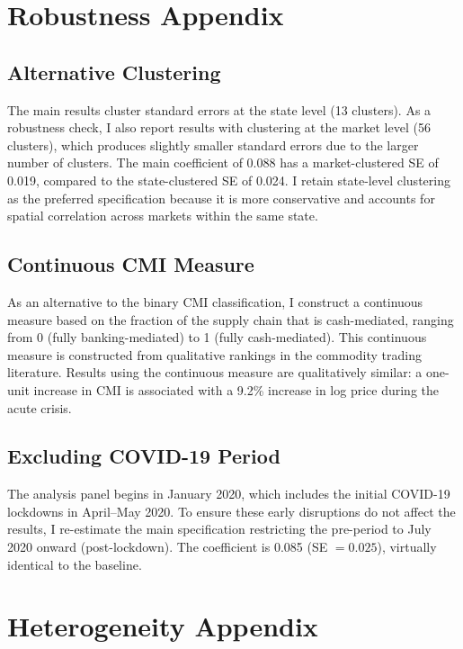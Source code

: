 \documentclass[12pt]{article}
\begin{document}
\section{Robustness Appendix}
\label{app:robustness}

\subsection{Alternative Clustering}

The main results cluster standard errors at the state level (13 clusters). As a robustness check, I also report results with clustering at the market level (56 clusters), which produces slightly smaller standard errors due to the larger number of clusters. The main coefficient of 0.088 has a market-clustered SE of 0.019, compared to the state-clustered SE of 0.024. I retain state-level clustering as the preferred specification because it is more conservative and accounts for spatial correlation across markets within the same state.

\subsection{Continuous CMI Measure}

As an alternative to the binary CMI classification, I construct a continuous measure based on the fraction of the supply chain that is cash-mediated, ranging from 0 (fully banking-mediated) to 1 (fully cash-mediated). This continuous measure is constructed from qualitative rankings in the commodity trading literature. Results using the continuous measure are qualitatively similar: a one-unit increase in CMI is associated with a 9.2\% increase in log price during the acute crisis.

\subsection{Excluding COVID-19 Period}

The analysis panel begins in January 2020, which includes the initial COVID-19 lockdowns in April--May 2020. To ensure these early disruptions do not affect the results, I re-estimate the main specification restricting the pre-period to July 2020 onward (post-lockdown). The coefficient is 0.085 (SE $= 0.025$), virtually identical to the baseline.


\section{Heterogeneity Appendix}
\label{app:heterogeneity}
\end{document}
